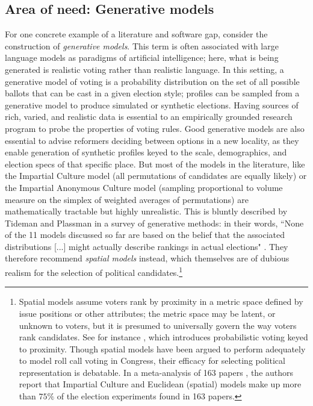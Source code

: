 \documentclass{article}
\begin{document}
\subsection{Area of need: Generative models}
For  one concrete example of a literature and software gap, consider the construction of {\em generative models}. This term is often associated with large language models as paradigms of artificial intelligence; here, what is being generated is realistic voting rather than realistic language.
In this setting, a generative model of voting is a probability distribution on the set of all possible ballots that can be cast in a given election style; profiles can be sampled from a generative model to produce simulated or synthetic elections.  Having sources of rich, varied, and realistic data is essential to an empirically grounded research program to probe the properties of voting rules.  Good generative models are also essential to advise reformers deciding between options in a new locality, as they enable generation of synthetic profiles keyed to the scale, demographics, and election specs of that specific place.
But most of the models in the literature, like the Impartial Culture model (all permutations of candidates are equally likely) or the Impartial Anonymous Culture model (sampling proportional to volume measure on the simplex of weighted averages of permutations) are mathematically tractable but highly unrealistic.  This is bluntly described by Tideman and Plassman in a survey of generative methods:  in their words, ``None of the 11 models discussed so far are based on the belief that the associated distributions [...] might actually describe rankings in actual elections"  \cite{Tideman2010TheSO}.  They therefore recommend {\em spatial models} instead, which themselves are of dubious realism for the selection of political candidates.\footnote{Spatial models assume voters rank by proximity in a metric space defined by issue positions or other attributes; the metric space may be latent, or unknown to voters, but it is presumed to universally govern the way voters rank candidates. 
See for instance \cite{Burden}, which introduces probabilistic voting keyed to proximity.  Though spatial models have been argued to perform adequately to model roll call voting in Congress, their efficacy for selecting political representation is debatable.
In a meta-analysis of 163 papers \cite{GuideExperiments}, the authors report that Impartial Culture and Euclidean (spatial) models make up more than $75\%$ of the election experiments found in 163 papers.}
\end{document}
